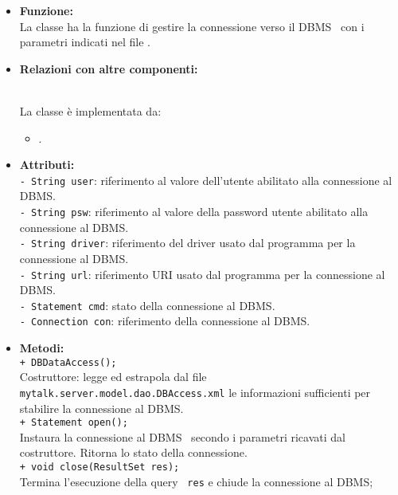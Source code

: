 {\begin{sloppypar}
{{{{\begin{itemize}
				\item[] \textbf{Funzione:}{\\
				La classe ha la funzione di gestire la connessione verso il DBMS\g~ con i parametri indicati nel file .\\
				 }
			
			\item[] \textbf{Relazioni con altre componenti:}{\\			
				La classe è implementata da: 
					\begin{itemize}
						\item[] .\\
					\end{itemize}
				}
				
				\item[] \textbf{Attributi:}{\\
					\texttt{- String user}: riferimento al valore dell'utente abilitato alla connessione al DBMS\g.\\
					
					\texttt{- String psw}: riferimento al valore della password utente abilitato alla connessione al DBMS\g.\\
					
					\texttt{- String driver}: riferimento del driver usato dal programma per la connessione al DBMS\g.\\
					
					\texttt{- String url}: riferimento URI usato dal programma per la connessione al DBMS\g.\\
					
					\texttt{- Statement cmd}: stato della connessione al DBMS\g.\\
					
					\texttt{- Connection con}: riferimento della connessione al DBMS\g.\\
				}
				
				\item[] \textbf{Metodi:}{\\
					\texttt{+ DBDataAccess();}\\
					Costruttore: legge ed estrapola dal file \texttt{mytalk.server.model.dao.DBAccess.xml} le informazioni sufficienti per stabilire la connessione al DBMS\g.\\
					
					\texttt{+ Statement open();}\\
					Instaura la connessione al DBMS\g~ secondo i parametri ricavati dal costruttore.
					Ritorna lo stato della connessione.\\
					
					\texttt{+ void close(ResultSet res);}\\
					Termina l'esecuzione della query\g~ \texttt{res} e chiude la connessione al DBMS;\\
				}
				
			\end{itemize}
		}%
	}%
  }%
}%
\end{sloppypar}
}%